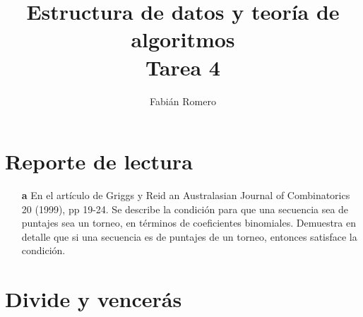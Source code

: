 \documentclass[12pt]{article}
\title{Estructura de datos y teoría de algoritmos\\
Tarea 4 }
\author{Fabián Romero}
\begin{document}
\lstset{language=python}
\maketitle

\section{Reporte de lectura}
\begin{itemize}

\item[\bf{a}] En el artículo de Griggs y Reid an Australasian Journal of Combinatorics 20 (1999), pp
19-24. Se describe la condición para que una secuencia sea de puntajes sea un torneo, en términos de coeficientes binomiales. Demuestra en detalle que si una secuencia es de
puntajes de un torneo, entonces satisface la condición.



\end{itemize}
\section{Divide y vencerás}
\end{document}
